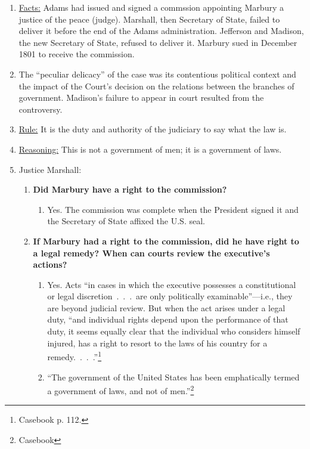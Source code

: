 \begin{enumerate}
    \item \underline{Facts:} Adams had issued and signed a commssion appointing Marbury a justice of 
    the peace (judge). Marshall, then Secretary of State, failed to deliver it before 
    the end of the Adams administration. Jefferson and Madison, the new 
    Secretary of State, refused to deliver it. Marbury sued in December 1801 
    to receive the commission.
    \item The ``peculiar delicacy'' of the case was its contentious political 
    context and the impact of the Court's decision on the relations between 
    the branches of government. Madison's failure to appear in court resulted 
    from the controversy.
    \item \underline{Rule:} It is the duty and authority of the judiciary to say what the law is.
\item \underline{Reasoning:} This is not a government of men; it is a government of laws. 
    \item Justice Marshall:
    \begin{enumerate}
        \item \textbf{Did Marbury have a right to the commission?}
        \begin{enumerate}
            \item Yes. The commission was complete when the President signed 
            it and the Secretary of State affixed the U.S. seal.
        \end{enumerate}
        \item \textbf{If Marbury had a right to the commission, did he have right to a 
        legal remedy? When can courts review the executive's actions?}
        \begin{enumerate}
            \item Yes. Acts ``in cases in which the executive possesses a 
            constitutional or legal discretion~.~.~.~are only politically 
            examinable''---i.e., they are beyond judicial review. But when the 
            act arises under a legal duty, ``and individual rights depend upon 
            the performance of that duty, it seems equally clear that the 
            individual who considers himself injured, has a right to resort to 
            the laws of his country for a remedy.~.~.~.''\footnote{Casebook p.  
            112.} 
            \item ``The government of the United States has been emphatically 
            termed a government of laws, and not of men.''\footnote{Casebook 
}
\end{enumerate}
\end{enumerate}
\end{enumerate}
